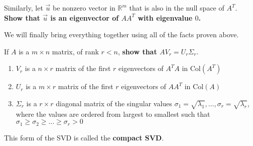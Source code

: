 \begin{enumerate}[resume]
\begin{enumerate}

  \ws{\vspace{75px}}


  \qitem Similarly, let $\vec{u}$ be nonzero vector in $\mathbb{R}^{m}$ that is also in the null space of $A^{T}.$
  \textbf{Show that $\vec{u}$ is an eigenvector of $AA^{T}$ with eigenvalue $0$.}

  \ws{\vspace{75px}}

  \end{enumerate}

  \newpage
  \qitem We will finally bring everything together using all of the facts proven above.

  If $A$ is a $m \times n$ matrix, of rank $r < n$, \textbf{show that $AV_{r} = U_{r} \Sigma_{r}.$}

  \begin{enumerate}
  \item $V_{r}$ is a $n \times r$ matrix of the first $r$ eigenvectors of $A^{T}A$ in $\text{Col}(A^{T})$
  \item $U_{r}$ is a $m \times r$ matrix of the first $r$ eigenvectors of $AA^{T}$ in $\text{Col}(A)$
  \item $\Sigma_{r}$ is a $r \times r$ diagonal matrix of the singular values $
  \sigma_1 = \sqrt{\lambda_{1}}, \dotsc, \sigma_r = \sqrt{\lambda_{r}}$, where the values are ordered from largest to smallest such that $\sigma_1 \geq \sigma_2 \geq \ldots \geq \sigma_r > 0$
  \end{enumerate}
  This form of the SVD is called the \textbf{compact SVD}.


\end{enumerate}
